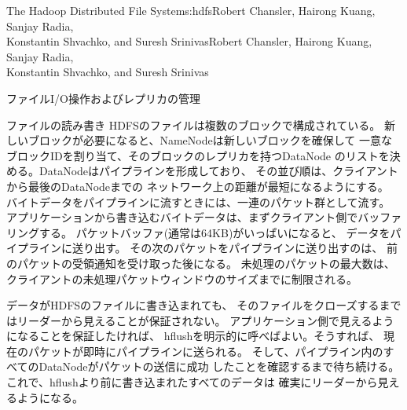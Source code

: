 \begin{aosachaptertoc}{The Hadoop Distributed File System}{s:hdfs}{Robert Chansler, Hairong Kuang, Sanjay Radia, \\ Konstantin Shvachko, and Suresh Srinivas}{Robert Chansler, Hairong Kuang, Sanjay Radia, \\ \hspace*{0.9cm} Konstantin Shvachko, and Suresh Srinivas}
\begin{aosasect1}{ファイルI/O操作およびレプリカの管理}
\begin{aosasect2}{ファイルの読み書き}
HDFSのファイルは複数のブロックで構成されている。
新しいブロックが必要になると、NameNodeは新しいブロックを確保して
一意なブロックIDを割り当て、そのブロックのレプリカを持つDataNode
のリストを決める。DataNodeはパイプラインを形成しており、
その並び順は、クライアントから最後のDataNodeまでの
ネットワーク上の距離が最短になるようにする。
バイトデータをパイプラインに流すときには、一連のパケット群として流す。
アプリケーションから書き込むバイトデータは、まずクライアント側でバッファリングする。
パケットバッファ(通常は64KB)がいっぱいになると、
データをパイプラインに送り出す。
その次のパケットをパイプラインに送り出すのは、
前のパケットの受領通知を受け取った後になる。
未処理のパケットの最大数は、
クライアントの未処理パケットウィンドウのサイズまでに制限される。

データがHDFSのファイルに書き込まれても、
そのファイルをクローズするまではリーダーから見えることが保証されない。
アプリケーション側で見えるようになることを保証したければ、
hflushを明示的に呼べばよい。そうすれば、
現在のパケットが即時にパイプラインに送られる。
そして、パイプライン内のすべてのDataNodeがパケットの送信に成功
したことを確認するまで待ち続ける。
これで、hflushより前に書き込まれたすべてのデータは
確実にリーダーから見えるようになる。



\end{aosasect2}
\end{aosasect1}
\end{aosachaptertoc}
